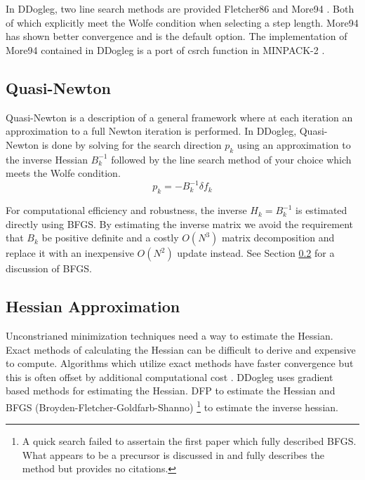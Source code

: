 \documentclass[peerreview,compsoc,onecolumn]{IEEEtran}
\begin{document}
In DDogleg, two line search methods are provided Fletcher86 \cite{Fletcher1986} and More94 \cite{More1994}. Both of which explicitly meet the Wolfe condition when selecting a step length. More94 has shown better convergence and is the default option. The implementation of More94 contained in DDogleg is a port of csrch function in MINPACK-2 \cite{MINPACK}.

\subsection{Quasi-Newton}

Quasi-Newton is a description of a general framework where at each iteration an approximation to a full Newton iteration is performed. In DDogleg, Quasi-Newton is done by solving for the search direction $p_k$ using an approximation to the inverse Hessian $B_k^{-1}$ followed by the line search method of your choice which meets the Wolfe condition.
\begin{equation}
p_k = -B_k^{-1}\delta f_k
\end{equation}

For computational efficiency and robustness, the inverse $H_k = B_k^{-1}$ is estimated directly using BFGS. By estimating the inverse matrix we avoid the requirement that $B_k$ be positive definite and a costly $O(N^3)$ matrix decomposition and replace it with an inexpensive $O(N^2)$ update instead. See Section \ref{sec:hessian_approx} for a discussion of BFGS. 
 
\subsection{Hessian Approximation}
\label{sec:hessian_approx}

Unconstrianed minimization techniques need a way to estimate the Hessian. Exact methods of calculating the Hessian can be difficult to derive and expensive to compute. Algorithms which utilize exact methods have faster convergence but this is often offset by additional computational cost \cite{numopt2006}. DDogleg uses gradient based methods for estimating the Hessian. DFP \cite{davidonDFP} to estimate the Hessian and BFGS (Broyden-Fletcher-Goldfarb-Shanno) \cite{fletcher1987,numopt2006}\footnote{A quick search failed to assertain the first paper which fully described BFGS. What appears to be a precursor is discussed in \cite{fletcher1987} and \cite{numopt2006} fully describes the method but provides no citations.} to estimate the inverse hessian.
\end{document}
